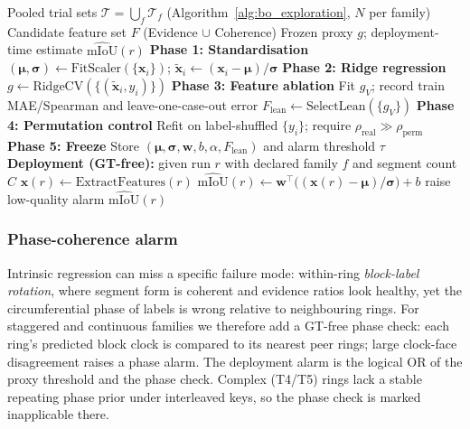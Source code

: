 \documentclass[a4paper,fleqn]{cas-dc}
\begin{document}
\begin{algorithm}[ht]
\caption{Proxy Calibration and GT-free Deployment Scoring}\label{alg:proxy}
\begin{algorithmic}[1]
\Require Pooled trial sets $\mathcal{T} = \bigcup_{f} \mathcal{T}_f$ (Algorithm~\ref{alg:bo_exploration}, $N$ per family)
\Require Candidate feature set $F$ (Evidence $\cup$ Coherence)
\Ensure Frozen proxy $g$; deployment-time estimate $\widehat{\text{mIoU}}(r)$
\State \textbf{Phase 1: Standardisation}
\State $(\boldsymbol{\mu}, \boldsymbol{\sigma}) \gets \text{FitScaler}(\{\mathbf{x}_i\})$; \quad $\tilde{\mathbf{x}}_i \gets (\mathbf{x}_i - \boldsymbol{\mu}) / \boldsymbol{\sigma}$
\State \textbf{Phase 2: Ridge regression}
\State $g \gets \text{RidgeCV}(\{(\tilde{\mathbf{x}}_i, y_i)\})$ 
\State \textbf{Phase 3: Feature ablation}
    \State Fit $g_V$; record train MAE/Spearman and leave-one-case-out error 
\EndFor
\State $F_{\text{lean}} \gets \text{SelectLean}(\{g_V\})$ 
\State \textbf{Phase 4: Permutation control}
\State Refit on label-shuffled $\{y_i\}$; require $\rho_{\text{real}} \gg \rho_{\text{perm}}$ 
\State \textbf{Phase 5: Freeze}
\State Store $(\boldsymbol{\mu}, \boldsymbol{\sigma}, \mathbf{w}, b, \alpha, F_{\text{lean}})$ and alarm threshold $\tau$ 
\State \textbf{Deployment (GT-free):} given run $r$ with declared family $f$ and segment count $C$
\State $\mathbf{x}(r) \gets \text{ExtractFeatures}(r)$ 
\State $\widehat{\text{mIoU}}(r) \gets \mathbf{w}^{\top} \big( (\mathbf{x}(r) - \boldsymbol{\mu}) / \boldsymbol{\sigma} \big) + b$
 raise low-quality alarm \EndIf
\State \Return $\widehat{\text{mIoU}}(r)$
\end{algorithmic}
\end{algorithm}

\subsubsection{Phase-coherence alarm}\label{sec:phase-alarm}

Intrinsic regression can miss a specific failure mode: within-ring \emph{block-label rotation}, where segment form is coherent and evidence ratios look healthy, yet the circumferential phase of labels is wrong relative to neighbouring rings. For staggered and continuous families we therefore add a GT-free phase check: each ring's predicted block clock is compared to its nearest peer rings; large clock-face disagreement raises a phase alarm. The deployment alarm is the logical OR of the proxy threshold and the phase check. Complex (T4/T5) rings lack a stable repeating phase prior under interleaved keys, so the phase check is marked inapplicable there.
\end{document}
